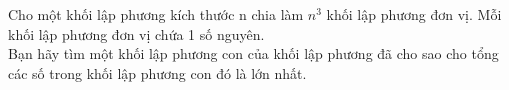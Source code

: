 Cho một khối lập phương kích thước n chia làm $n^{3}$ khối lập phương đơn vị. Mỗi khối lập phương đơn vị chứa 1 số nguyên.
\\Bạn hãy tìm một khối lập phương con của khối lập phương đã cho sao cho tổng các số trong khối lập phương con đó là lớn nhất.